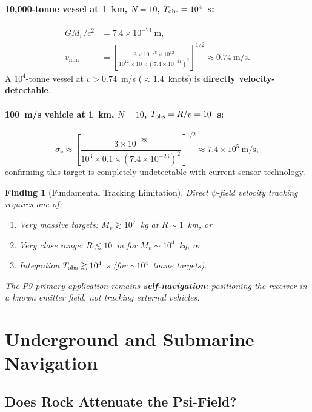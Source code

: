 \documentclass[aps,prd,twocolumn,superscriptaddress,nofootinbib]{revtex4-2}
\newtheorem{finding}{Finding}
\begin{document}
\paragraph{10,000-tonne vessel at 1~km, $N=10$, $T_{\rm obs}=10^4$~s:}
\begin{align}
GM_v/c^2 &= 7.4\times10^{-21}~\mathrm{m}, \\
v_{\min} &= \left[\frac{3\times10^{-28}\times10^{12}}{10^{12}\times10\times(7.4\times10^{-21})^2}\right]^{1/2}
\approx 0.74~\mathrm{m/s}.
\end{align}
A $10^4$-tonne vessel at $v > 0.74$~m/s ($\approx1.4$~knots) is
\textbf{directly velocity-detectable}.

\paragraph{100~m/s vehicle at 1~km, $N=10$, $T_{\rm obs}=R/v=10$~s:}
\begin{equation}
\sigma_v \approx \left[\frac{3\times10^{-28}}{10^3\times0.1\times(7.4\times10^{-23})^2}\right]^{1/2}
\approx 7.4\times10^5~\mathrm{m/s},
\end{equation}
confirming this target is completely undetectable with current sensor
technology.

\begin{finding}[Fundamental Tracking Limitation]
\label{find:tracking}
Direct $\psi$-field velocity tracking requires one of:
\begin{enumerate}
\item Very massive targets: $M_v \gtrsim 10^7$~kg at $R \sim 1$~km, or
\item Very close range: $R \lesssim 10$~m for $M_v \sim 10^4$~kg, or
\item Integration $T_{\rm obs} \gtrsim 10^4$~s (for $\sim10^4$~tonne targets).
\end{enumerate}
The P9 primary application remains \textbf{self-navigation}: positioning
the receiver in a known emitter field, not tracking external vehicles.
\end{finding}

\section{Underground and Submarine Navigation}
\label{sec:underground}

\subsection{Does Rock Attenuate the Psi-Field?}
\end{document}
